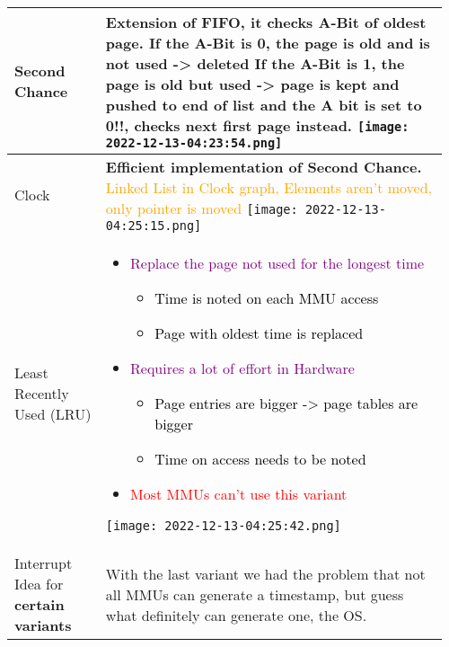 \documentclass[main.tex,fontsize=8pt,paper=a4,paper=portrait,DIV=calc,]{scrartcl}
\begin{document}
\begin{table}[ht!]
\begin{tabular}{|m{0.2\linewidth}|m{0.755\linewidth}|}
\hline
Second Chance & 
\textbf{Extension of FIFO, it checks A-Bit of oldest page.}\newline
If the A-Bit is 0, the page is \textbf{old and is not used} -> deleted\newline
If the A-Bit is 1, the page is \textbf{old but used} -> page is kept and pushed to end of list \textbf{and the A bit is set to 0!!}, checks next first page instead.\newline
\texttt{[image: 2022-12-13-04:23:54.png]}\\
\hline
Clock & 
\textbf{Efficient implementation of Second Chance.}\newline
\textcolor{orange}{Linked List in Clock graph, Elements aren't moved, only pointer is moved}\newline
\texttt{[image: 2022-12-13-04:25:15.png]}\\
\hline
Least Recently Used (LRU) & 
\begin{itemize}
\item \textcolor{purple}{Replace the page not used for the longest time}\newline
  \begin{itemize}
  \item \textcolor{black}{Time is noted on each MMU access}
  \item \textcolor{black}{Page with oldest time is replaced}
  \end{itemize}  
\item \textcolor{purple}{Requires a lot of effort in Hardware}\newline
  \begin{itemize}
  \item \textcolor{black}{Page entries are bigger -> page tables are bigger}
  \item \textcolor{black}{Time on access needs to be noted}
  \end{itemize}  
\item \textcolor{red}{Most MMUs can't use this variant}
\vspace{-3mm}
\end{itemize} 
\texttt{[image: 2022-12-13-04:25:42.png]}\\
\hline
Interrupt Idea for \textbf{certain variants} & 
With the last variant we had the problem that not all MMUs can generate a timestamp, but guess what definitely can generate one, the OS.\newline

\end{tabular}
\end{table}
\end{document}
